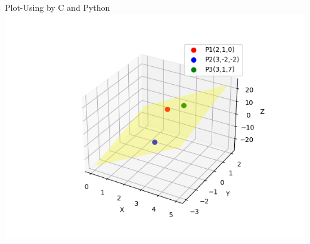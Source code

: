 \documentclass{beamer}
\begin{document}
\begin{frame}{Plot-Using by C and Python}
    \centering
    \includegraphics[width=\columnwidth, height=0.8\textheight, keepaspectratio]{figs/fig6.1.png}     
\end{frame}
\end{document}
